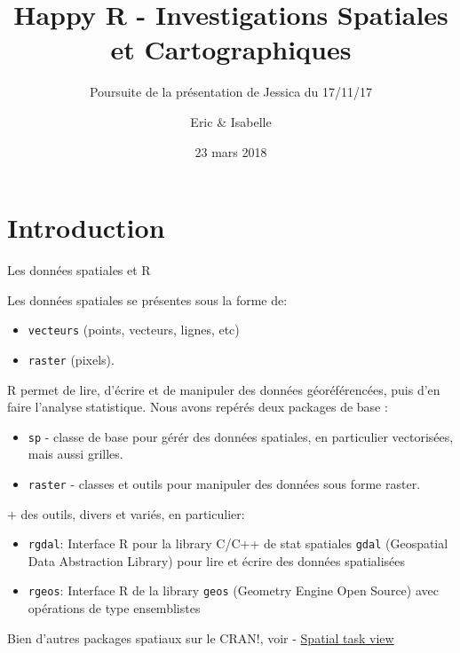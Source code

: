 \documentclass[8pt,ignorenonframetext,]{beamer}
\title{Happy R - Investigations Spatiales et Cartographiques}
\subtitle{Poursuite de la présentation de Jessica du 17/11/17}
\author{Eric \& Isabelle}
\date{23 mars 2018}
\begin{document}
\frame{\titlepage}

\section{Introduction}\label{introduction}

\begin{frame}[fragile]{Les données spatiales et R}

Les données spatiales se présentes sous la forme de:

\begin{itemize}
\item
  \texttt{vecteurs} (points, vecteurs, lignes, etc)
\item
  \texttt{raster} (pixels).
\end{itemize}

R permet de lire, d'écrire et de manipuler des données géoréférencées,
puis d'en faire l'analyse statistique. Nous avons repérés deux packages
de base :

\begin{itemize}
\item
  \texttt{sp} - classe de base pour gérér des données spatiales, en
  particulier vectorisées, mais aussi grilles.
\item
  \texttt{raster} - classes et outils pour manipuler des données sous
  forme raster.
\end{itemize}

\(+\) des outils, divers et variés, en particulier:

\begin{itemize}
\item
  \texttt{rgdal}: Interface R pour la library C/C++ de stat spatiales
  \texttt{gdal} (Geospatial Data Abstraction Library) pour lire et
  écrire des données spatialisées
\item
  \texttt{rgeos}: Interface R de la library \texttt{geos} (Geometry
  Engine Open Source) avec opérations de type ensemblistes
\end{itemize}

Bien d'autres packages spatiaux sur le CRAN!, voir -
\href{http://cran.r-project.org/web/views/Spatial.html}{Spatial task
view}

\end{frame}
\end{document}
